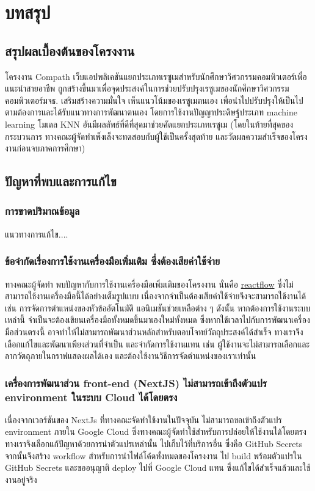 \chapter{บทสรุป}

\section{สรุปผลเบื้องต้นของโครงงาน}
\par{
    โครงงาน Compath เว็บแอปพลิเคชันแยกประเภทเรซูเมสำหรับนักศึกษาวิศวกรรมคอมพิวเตอร์เพื่อแนะนำสายอาชีพ
    ถูกสร้างขึ้นมาเพื่อจุดประสงค์ในการช่วยปรับปรุงเรซูเมของนักศึกษาวิศวกรรมคอมพิวเตอร์มจธ. เสริมสร้างความมั่นใจ เห็นแนวโน้มของเรซูเมตนเอง เพื่อนำไปปรับปรุงให้เป็นไปตามต้องการและได้รับแนวทางการพัฒนาตนเอง
    โดยการใช้งานปัญญาประดิษฐ์ประเภท machine learning โมเดล KNN อันมีผลลัพธ์ที่ดีที่สุดมาช่วยคัดแยกประเภทเรซูเม (โดยในท้ายที่สุดของกระบวนการ ทางคณะผู้จัดทำเพ็งเล็งจะทดสอบกับผู้ใช้เป็นครั้งสุดท้าย และวัดผลความสำเร็จของโครงงานก่อนจบภาคการศึกษา)
}

\section{ปัญหาที่พบและการแก้ไข}
\subsection{การขาดปริมาณข้อมูล}
\par{แนวทางการแก้ไข....}
\subsection{ข้อจำกัดเรื่องการใช้งานเครื่องมือเพิ่มเติม ซึ่งต้องเสียค่าใช้จ่าย}
\par{
    ทางคณะผู้จัดทำ พบปัญหากับการใช้งานเครื่องมือเพิ่มเติมของโครงงาน นั่นคือ \hyperref[subsec:reactflow]{reactflow} ซึ่งไม่สามารถใช้งานเครื่องมือนี้ได้อย่างเต็มรูปแบบ
    เนื่องจากจำเป็นต้องเสียค่าใช้จ่ายจึงจะสามารถใช้งานได้ เช่น การจัดการตำแหน่งของหัวข้ออัตโนมัติ แอนิเมชันช่วยเหลือต่าง ๆ ดังนั้น หากต้องการใช้งานระบบเหล่านี้ จำเป็นจะต้องเขียนเครื่องมือทั้งหมดขึ้นมาเองใหม่ทั้งหมด
    ซึ่งหากใช้เวลาไปกับการพัฒนาเครื่องมือส่วนตรงนี้ อาจทำให้ไม่สามารถพัฒนาส่วนหลักสำหรับตอบโจทย์วัตถุประสงค์ได้สำเร็จ ทางเราจึงเลือกแก้ไขและพัฒนาเพียงส่วนที่จำเป็น และจำกัดการใช้งานแทน
    เช่น ผู้ใช้งานจะไม่สามารถเลือกและลากวัตถุภายในกราฟแสดงผลได้เอง และต้องใช้งานวิธีการจัดตำแหน่งของเราเท่านั้น
}
\subsection{เครื่องการพัฒนาส่วน front-end (NextJS) ไม่สามารถเข้าถึงตัวแปร environment ในระบบ Cloud ได้โดยตรง}
\par{
    เนื่องจากเวอร์ชันของ NextJs ที่ทางคณะจัดทำใช้งานในปัจจุบัน ไม่สามารถขอเข้าถึงตัวแปร environment ภายใน Google Cloud ซึ่งทางคณะผู้จัดทำใช้สำหรับการปล่อยให้ใช้งานได้โดยตรง
    ทางเราจึงเลือกแก้ปัญหาด้วยการนำตัวแปรเหล่านั้น ไปเก็บไว้ที่บริการอื่น ซึ่งคือ GitHub Secrets จากนั้นจึงสร้าง workflow สำหรับการนำไฟล์โค้ดทั้งหมดของโครงงาน
    ไป build พร้อมตัวแปรใน GitHub Secrets และขออนุญาติ deploy ไปที่ Google Cloud แทน ซึ่งแก้ไขได้สำเร็จแล้วและใช้งานอยู่จริง
}

